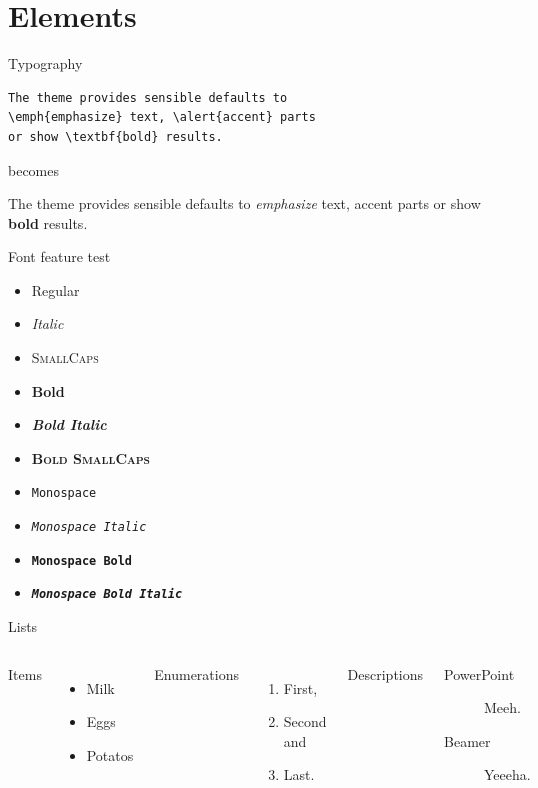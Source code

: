 \documentclass[10pt,aspectratio=169]{beamer} %
\begin{document}
\section{Elements}
\begin{frame}[fragile]{Typography}
      \begin{verbatim}The theme provides sensible defaults to
\emph{emphasize} text, \alert{accent} parts
or show \textbf{bold} results.\end{verbatim}

  \begin{center}becomes\end{center}

  The theme provides sensible defaults to \emph{emphasize} text,
  \alert{accent} parts or show \textbf{bold} results.
\end{frame}
\begin{frame}{Font feature test}
  \begin{itemize}
    \item Regular
    \item \textit{Italic}
    \item \textsc{SmallCaps}
    \item \textbf{Bold}
    \item \textbf{\textit{Bold Italic}}
    \item \textbf{\textsc{Bold SmallCaps}}
    \item \texttt{Monospace}
    \item \texttt{\textit{Monospace Italic}}
    \item \texttt{\textbf{Monospace Bold}}
    \item \texttt{\textbf{\textit{Monospace Bold Italic}}}
  \end{itemize}
\end{frame}
\begin{frame}{Lists}
  \begin{columns}[T,onlytextwidth]
      Items
      \begin{itemize}
        \item Milk \item Eggs \item Potatos
      \end{itemize}

      Enumerations
      \begin{enumerate}
        \item First, \item Second and \item Last.
      \end{enumerate}

      Descriptions
      \begin{description}
        \item[PowerPoint] Meeh. \item[Beamer] Yeeeha.
      \end{description}
  \end{columns}
\end{frame}
\end{document}
